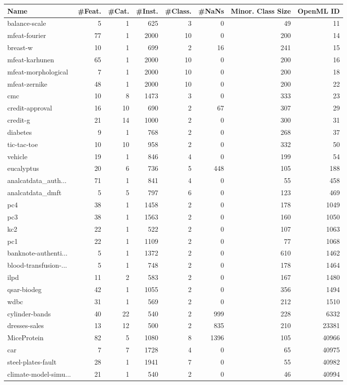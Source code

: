 \begin{tabular}{@{\hskip 0mm}l@{\hskip 0mm}rrrrrrr}
\toprule
 Name & \#Feat. &  \#Cat. &  \#Inst. &  \#Class. &  \#NaNs &  Minor. Class Size & OpenML ID \\
\midrule
 balance-scale & 5 & 1 & 625 & 3 &   0 & 49 &    11 \\
 mfeat-fourier & 77 & 1 & 2000 & 10 &   0 & 200 &    14 \\
 breast-w & 10 & 1 & 699 & 2 &  16 & 241 &    15 \\
 mfeat-karhunen & 65 & 1 & 2000 & 10 &   0 & 200 &    16 \\
 mfeat-morphological & 7 & 1 & 2000 & 10 &   0 & 200 &    18 \\
 mfeat-zernike & 48 & 1 & 2000 & 10 &   0 & 200 &    22 \\
 cmc & 10 & 8 & 1473 & 3 &   0 & 333 &    23 \\
 credit-approval & 16 &    10 & 690 & 2 &  67 & 307 &    29 \\
 credit-g & 21 &    14 & 1000 & 2 &   0 & 300 &    31 \\
 diabetes & 9 & 1 & 768 & 2 &   0 & 268 &    37 \\
 tic-tac-toe & 10 &    10 & 958 & 2 &   0 & 332 &    50 \\
 vehicle & 19 & 1 & 846 & 4 &   0 & 199 &    54 \\
 eucalyptus & 20 & 6 & 736 & 5 & 448 & 105 &   188 \\
 analcatdata\_auth... & 71 & 1 & 841 & 4 &   0 & 55 &   458 \\
 analcatdata\_dmft & 5 & 5 & 797 & 6 &   0 & 123 &   469 \\
 pc4 & 38 & 1 & 1458 & 2 &   0 & 178 &  1049 \\
 pc3 & 38 & 1 & 1563 & 2 &   0 & 160 &  1050 \\
 kc2 & 22 & 1 & 522 & 2 &   0 & 107 &  1063 \\
 pc1 & 22 & 1 & 1109 & 2 &   0 & 77 &  1068 \\
 banknote-authenti... & 5 & 1 & 1372 & 2 &   0 & 610 &  1462 \\
blood-transfusion-... & 5 & 1 & 748 & 2 &   0 & 178 &  1464 \\
ilpd & 11 & 2 & 583 & 2 &   0 & 167 &  1480 \\
qsar-biodeg & 42 & 1 & 1055 & 2 &   0 & 356 &  1494 \\
wdbc & 31 & 1 & 569 & 2 &   0 & 212 &  1510 \\
cylinder-bands & 40 &    22 & 540 & 2 & 999 & 228 &  6332 \\
dresses-sales & 13 &    12 & 500 & 2 & 835 & 210 & 23381 \\
MiceProtein & 82 & 5 & 1080 & 8 &    1396 & 105 & 40966 \\
car & 7 & 7 & 1728 & 4 &   0 & 65 & 40975 \\
steel-plates-fault & 28 & 1 & 1941 & 7 &   0 & 55 & 40982 \\
climate-model-simu... & 21 & 1 & 540 & 2 &   0 & 46 & 40994 \\
\bottomrule
\end{tabular}
